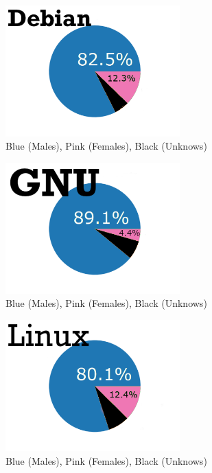 \documentclass[a4paper]{article}
\begin{document}
\begin{figure}
  \centering
  \includegraphics[width=0.6\textwidth]{images/debian.gender.pretty.pdf}
  \caption[Caption for LOF]{Blue (Males), Pink (Females), Black (Unknows)}
\end{figure}

\begin{figure}
  \centering
  \includegraphics[width=0.6\textwidth]{images/gnu.gender.pretty.pdf}
  \caption[Caption for LOF]{Blue (Males), Pink (Females), Black (Unknows)}  
\end{figure}


\begin{figure}
  \centering
  \includegraphics[width=0.6\textwidth]{images/linux.gender.pretty.pdf}
  \caption[Caption for LOF]{Blue (Males), Pink (Females), Black (Unknows)}    
\end{figure}
\end{document}
